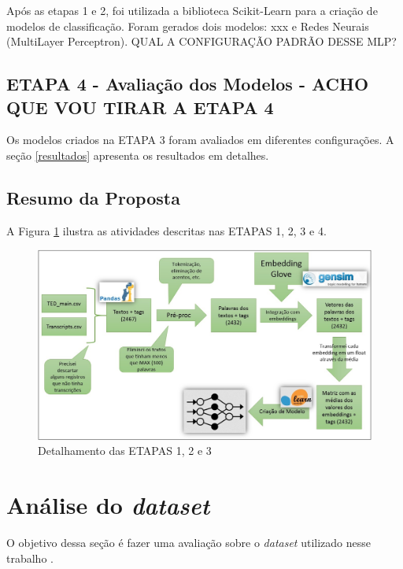 \documentclass{article}
\begin{document}
Após as etapas 1 e 2, foi utilizada a biblioteca Scikit-Learn \citep{scikit} para a criação de modelos de classificação. Foram gerados dois modelos: xxx e Redes Neurais (MultiLayer Perceptron). QUAL A CONFIGURAÇÃO PADRÃO DESSE MLP?

\subsection{ETAPA 4 - Avaliação dos Modelos - ACHO QUE VOU TIRAR A ETAPA 4}

Os modelos criados na ETAPA 3 foram avaliados em diferentes configurações. A seção \ref{resultados} apresenta os resultados em detalhes.

\subsection{Resumo da Proposta}

A Figura \ref{fig:fluxo} ilustra as atividades descritas nas ETAPAS 1, 2, 3 e 4.

\begin{figure}[h!]
\centering
\includegraphics[scale=0.35]{fluxo2.jpg}
\caption{Detalhamento das ETAPAS 1, 2 e 3}
\label{fig:fluxo}
\end{figure}


\section{Análise do \textit{dataset}}

O objetivo dessa seção é fazer uma avaliação sobre o \textit{dataset} utilizado nesse trabalho \citep{datasetTED}.\\
\end{document}
